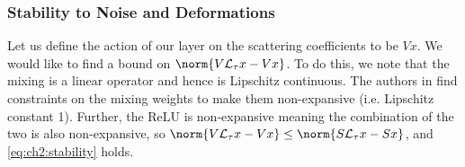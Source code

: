 \subsubsection{Stability to Noise and Deformations}
Let us define the action of our layer on the scattering
coefficients to be $Vx$. We would like to find a bound on $\norm{V\mathcal{L}_\tau x -
V x}$. To do this, we note that the mixing is a linear operator and hence is
Lipschitz continuous. The authors in \cite{qiu_dcfnet:_2018} find constraints on the mixing
weights to make them non-expansive (i.e. Lipschitz constant 1).
Further, the ReLU is non-expansive meaning the combination of the two is
also non-expansive, so $\norm{V\mathcal{L}_\tau x - V x} \leq \norm{S\mathcal{L}_\tau
x - Sx}$, and \eqref{eq:ch2:stability} holds.


